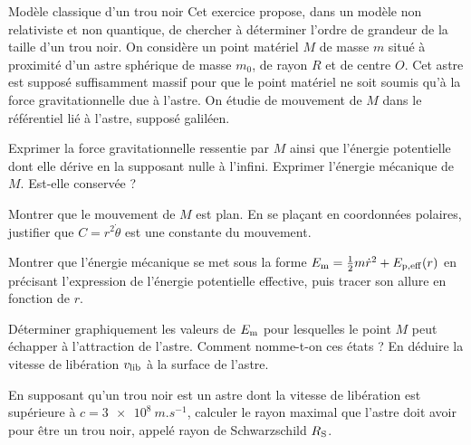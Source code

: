 \begin{exo}[PCSI]{Modèle classique d'un trou noir}
Cet exercice propose, dans un modèle non relativiste et non quantique, de chercher à déterminer l'ordre de grandeur de la taille d'un trou noir. On considère un point matériel $M$ de masse $m$ situé à proximité d'un astre sphérique de masse $m_0$, de rayon $R$ et de centre $O$. Cet astre est supposé suffisamment massif pour que le point matériel ne soit soumis qu'à la force gravitationnelle due à l'astre. On étudie de mouvement de $M$ dans le référentiel lié à l'astre, supposé galiléen.
\begin{quest}
\item Exprimer la force gravitationnelle ressentie par $M$ ainsi que l'énergie potentielle dont elle dérive en la supposant nulle à l'infini. Exprimer l'énergie mécanique de $M$. Est-elle conservée ?
\item Montrer que le mouvement de $M$ est plan. En se plaçant en coordonnées polaires, justifier que $C=r^2\dot{\theta}$ est une constante du mouvement.
\item Montrer que l'énergie mécanique se met sous la forme $E_{\rm{m}}=\frac{1}{2}m\dot{r}^2+E_{\rm{p,eff}}(r)$ en précisant l'expression de l'énergie potentielle effective, puis tracer son allure en fonction de $r$.
\item Déterminer graphiquement les valeurs de $E_{\rm{m}}$ pour lesquelles le point $M$ peut échapper à l'attraction de l'astre. Comment nomme-t-on ces états ? En déduire la vitesse de libération $v_{\rm{lib}}$ à la surface de l'astre.
\item En supposant qu'un trou noir est un astre dont la vitesse de libération est supérieure à $c=\SI{3e8}{m.s^{-1}}$, calculer le rayon maximal que l'astre doit avoir pour être un trou noir, appelé rayon de Schwarzschild $R_{\rm{S}}$.
\end{quest}
\end{exo}

